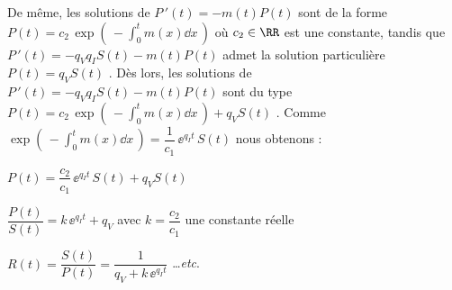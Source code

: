\medskip

De même, les solutions de $P\,'(t) = - m(t) P(t)$ sont de la forme $\displaystyle P(t) = c_2 \, \exp \left( \, - \int_0^t m(x) \dd{x} \, \right)$ où $c_2 \in \RR$ est une constante, tandis que $P\,'(t) = - q_V q_I S(t) - m(t) P(t)$ admet la solution particulière $P(t) = q_V S(t)$ .
Dès lors, les solutions de $P\,'(t) = - q_V q_I S(t) - m(t) P(t)$ sont du type
$\displaystyle P(t) = c_2 \, \exp \left( \, - \int_0^t m(x) \dd{x} \, \right) + q_V S(t)$ .
Comme $\displaystyle \exp \left( \, - \int_0^t m(x) \dd{x} \, \right) = \dfrac{1}{c_1} \, \ee^{q_I t} \, S(t)$ nous obtenons :

\medskip

$P(t) = \dfrac{c_2}{c_1} \, \ee^{q_I t} \, S(t) + q_V S(t)$

\medskip

$\dfrac{P(t)}{S(t)} = k \, \ee^{q_I t} + q_V$ avec $k = \dfrac{c_2}{c_1}$ une constante réelle

\medskip

$R(t) = \dfrac{S(t)}{P(t)} = \dfrac{1}{q_V + k \, \ee^{q_I t}}$ \dots \emph{etc}.
